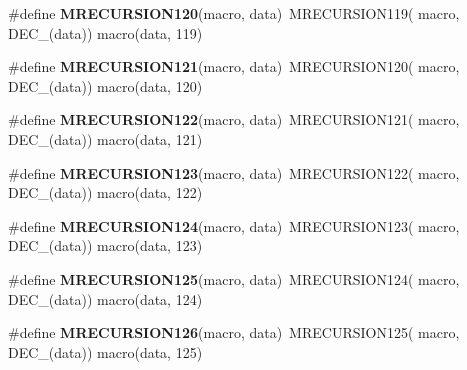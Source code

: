 \begin{DoxyCompactItemize}
\item 
\hypertarget{group__group__sam0__utils__mrecursion_ga5efb0e5825610432e0101ca6efdcb33d}{}\#define {\bfseries M\+R\+E\+C\+U\+R\+S\+I\+O\+N120}(macro,  data)~M\+R\+E\+C\+U\+R\+S\+I\+O\+N119(  macro, D\+E\+C\+\_\+(data))   macro(data, 119)\label{group__group__sam0__utils__mrecursion_ga5efb0e5825610432e0101ca6efdcb33d}

\item 
\hypertarget{group__group__sam0__utils__mrecursion_ga4529da10901e76e10423312547ba7a2b}{}\#define {\bfseries M\+R\+E\+C\+U\+R\+S\+I\+O\+N121}(macro,  data)~M\+R\+E\+C\+U\+R\+S\+I\+O\+N120(  macro, D\+E\+C\+\_\+(data))   macro(data, 120)\label{group__group__sam0__utils__mrecursion_ga4529da10901e76e10423312547ba7a2b}

\item 
\hypertarget{group__group__sam0__utils__mrecursion_ga03c32f49f3c98b918cb9924148830594}{}\#define {\bfseries M\+R\+E\+C\+U\+R\+S\+I\+O\+N122}(macro,  data)~M\+R\+E\+C\+U\+R\+S\+I\+O\+N121(  macro, D\+E\+C\+\_\+(data))   macro(data, 121)\label{group__group__sam0__utils__mrecursion_ga03c32f49f3c98b918cb9924148830594}

\item 
\hypertarget{group__group__sam0__utils__mrecursion_ga30375f3389d17c9a74c638545b293447}{}\#define {\bfseries M\+R\+E\+C\+U\+R\+S\+I\+O\+N123}(macro,  data)~M\+R\+E\+C\+U\+R\+S\+I\+O\+N122(  macro, D\+E\+C\+\_\+(data))   macro(data, 122)\label{group__group__sam0__utils__mrecursion_ga30375f3389d17c9a74c638545b293447}

\item 
\hypertarget{group__group__sam0__utils__mrecursion_ga954c2a20af7ae897731bdf294cdcbc5a}{}\#define {\bfseries M\+R\+E\+C\+U\+R\+S\+I\+O\+N124}(macro,  data)~M\+R\+E\+C\+U\+R\+S\+I\+O\+N123(  macro, D\+E\+C\+\_\+(data))   macro(data, 123)\label{group__group__sam0__utils__mrecursion_ga954c2a20af7ae897731bdf294cdcbc5a}

\item 
\hypertarget{group__group__sam0__utils__mrecursion_gae1c7af2acfa6b9eaef99a5da874a9f59}{}\#define {\bfseries M\+R\+E\+C\+U\+R\+S\+I\+O\+N125}(macro,  data)~M\+R\+E\+C\+U\+R\+S\+I\+O\+N124(  macro, D\+E\+C\+\_\+(data))   macro(data, 124)\label{group__group__sam0__utils__mrecursion_gae1c7af2acfa6b9eaef99a5da874a9f59}

\item 
\hypertarget{group__group__sam0__utils__mrecursion_gaad1e2676e5d1416512a90b49274370c0}{}\#define {\bfseries M\+R\+E\+C\+U\+R\+S\+I\+O\+N126}(macro,  data)~M\+R\+E\+C\+U\+R\+S\+I\+O\+N125(  macro, D\+E\+C\+\_\+(data))   macro(data, 125)\label{group__group__sam0__utils__mrecursion_gaad1e2676e5d1416512a90b49274370c0}


\end{DoxyCompactItemize}
